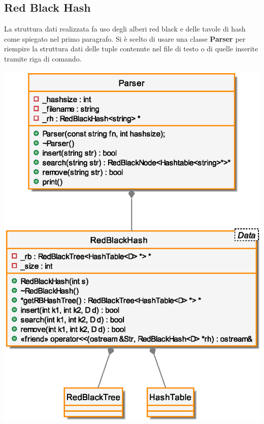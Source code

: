 \newpage
\subsection{Red Black Hash}
La struttura dati realizzata fa uso degli alberi red black
e delle tavole di hash come spiegato nel primo paragrafo.
Si è scelto di usare una classe \textbf{Parser} per riempire la
struttura dati delle tuple contenute nel file di testo
o di quelle inserite tramite riga di comando.
\begin{center}
\includegraphics[scale=0.8]{src/rbhash/2img/rbhash.eps}
\end{center}